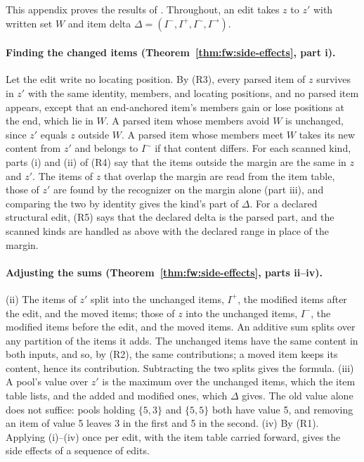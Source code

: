 
This appendix proves the results of . Throughout, an edit takes $z$ to $z'$ with written set
$W$ and item delta $\Delta = (I^-, I^+, I^\sim, I^\to)$.

\paragraph{Finding the changed items (Theorem~\ref{thm:fw:side-effects}, part i).}
Let the edit write no locating position. By (R3), every parsed item of $z$ survives in $z'$ with the same identity,
members, and locating positions, and no parsed item appears, except that an end-anchored item's members gain or lose
positions at the end, which lie in $W$. A parsed item whose members avoid $W$ is unchanged, since $z'$ equals $z$
outside $W$. A parsed item whose members meet $W$ takes its new content from $z'$ and belongs to $I^\sim$ if that
content differs. For each scanned kind, parts (i) and (ii) of (R4) say that the items outside the margin are the same
in $z$ and $z'$. The items of $z$ that overlap the margin are read from the item table, those of $z'$ are found by the
recognizer on the margin alone (part iii), and comparing the two by identity gives the kind's part of $\Delta$. For a
declared structural edit, (R5) says that the declared delta is the parsed part, and the scanned kinds are handled as
above with the declared range in place of the margin.

\paragraph{Adjusting the sums (Theorem~\ref{thm:fw:side-effects}, parts ii--iv).}
(ii) The items of $z'$ split into the unchanged items, $I^+$, the modified items after the edit, and the moved items;
those of $z$ into the unchanged items, $I^-$, the modified items before the edit, and the moved items. An additive sum
splits over any partition of the items it adds. The unchanged items have the same content in both inputs, and so, by
(R2), the same contributions; a moved item keeps its content, hence its contribution. Subtracting the two splits gives
the formula. (iii) A pool's value over $z'$ is the maximum over the unchanged items, which the item table lists, and
the added and modified ones, which $\Delta$ gives. The old value alone does not suffice: pools holding $\{5, 3\}$ and
$\{5, 5\}$ both have value 5, and removing an item of value 5 leaves 3 in the first and 5 in the second. (iv) By (R1).
Applying (i)--(iv) once per edit, with the item table carried forward, gives the side effects of a sequence of edits.

